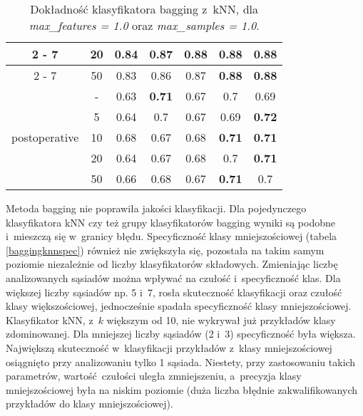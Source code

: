 \begin{table}[H]
\begin{center}
{\begin{tabular}{c|c|ccccc}
				\cline{2%
					-%
					7}%
				&20&0.84&0.87&\textbf{0.88}&\textbf{0.88}&\textbf{0.88}\\%
				\cline{2%
					-%
					7}%
				&50&0.83&0.86&0.87&\textbf{0.88}&\textbf{0.88}\\%
				\hline%
				\multirow{5}{*}{postoperative}&{-}&0.63&\textbf{0.71}&0.67&0.7&0.69\\%
				\cline{2%
					-%
					7}%
				&5&0.64&0.7&0.67&0.69&\textbf{0.72}\\%
				\cline{2%
					-%
					7}%
				&10&0.68&0.67&0.68&\textbf{0.71}&\textbf{0.71}\\%
				\cline{2%
					-%
					7}%
				&20&0.64&0.67&0.68&0.7&\textbf{0.71}\\%
				\cline{2%
					-%
					7}%
				&50&0.66&0.68&0.67&\textbf{0.71}&0.7\\%
				\hline%
			\end{tabular}}
			\caption{Dokładność klasyfikatora bagging z~kNN, dla \textit{max\_features = 1.0} oraz \textit{max\_samples = 1.0}.}
			\label{baggingknnacc}
		\end{center}
	\end{table}
Metoda bagging nie poprawiła jakości klasyfikacji. Dla pojedynczego klasyfikatora kNN czy też grupy klasyfikatorów bagging wyniki są podobne i~mieszczą się w~granicy błędu. Specyficzność klasy mniejszościowej (tabela \ref{baggingknnspec}) również nie zwiększyła się, pozostała na takim samym poziomie niezależnie od liczby klasyfikatorów składowych. Zmieniając liczbę analizowanych sąsiadów można wpływać na czułość i~specyficzność klas. Dla większej liczby sąsiadów np. 5 i~7, rosła skuteczność klasyfikacji oraz czułość klasy większościowej, jednocześnie spadała specyficzność klasy mniejszościowej. Klasyfikator kNN, z~$k$ większym od 10, nie wykrywał już przykładów klasy zdominowanej. Dla mniejszej liczby sąsiadów (2 i~3) specyficzność była większa. Największą skuteczność w~klasyfikacji przykładów z~klasy mniejszościowej osiągnięto przy analizowaniu tylko 1 sąsiada. Niestety, przy zastosowaniu takich parametrów, wartość czułości uległa zmniejszeniu, a~precyzja klasy mniejszościowej była na niskim poziomie (duża liczba błędnie zakwalifikowanych przykładów do klasy mniejszościowej). \par

